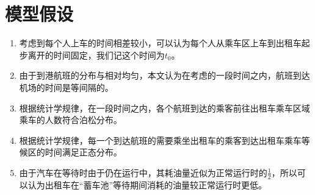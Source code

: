 \documentclass{cumcm}
\begin{document}
\section{模型假设}
\begin{enumerate}
	\item 考虑到每个人上车的时间相差较小，可以认为每个人从乘车区上车到出租车起步离开的时间固定，我们记这个时间为$t_0$。
	\item 由于到港航班的分布与相对均匀，本文认为在考虑的一段时间之内，航班到达机场的时间是等间隔的。
	\item 根据统计学规律，在一段时间之内，各个航班到达的乘客前往出租车乘车区域乘车的人数符合泊松分布。
	\item 根据统计学规律，每一个到达航班的需要乘坐出租车的乘客到达出租车乘车等候区的时间满足正态分布。
	\item 由于汽车在等待时由于仍在运行中，其耗油量近似为正常运行时的$\frac{1}{2}$，所以可以认为出租车在“蓄车池”等待期间消耗的油量较正常运行时更低。
\end{enumerate}

\newcommand{\flightnum}{$N_f$}
\newcommand{\taxinum}{$N_c$}
\newcommand{\waittime}{$t_w$}
\end{document}
